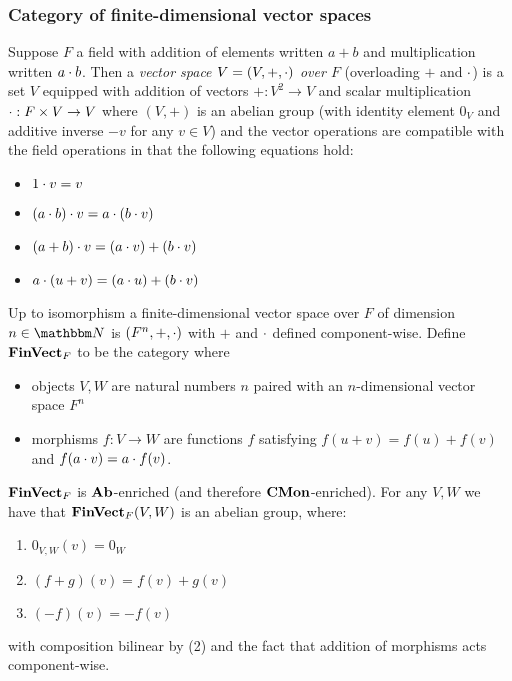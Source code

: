 \subsubsection{Category of finite-dimensional vector spaces}
\label{sec:categories-with-biproducts:fdvect}

\begin{definition}
Suppose $F$ a field with addition of elements written $a + b$ and multiplication written $a \cdot b$. Then a
\emph{vector space $V = (V, +, \cdot)$ over $F$} (overloading $+$ and $\cdot$) is a set $V$ equipped with
addition of vectors $+: V^2 \to V$ and scalar multiplication $\cdot: F \times V \to V$ where $(V,+)$ is an
abelian group (with identity element $0_V$ and additive inverse $-v$ for any $v \in V$) and the vector
operations are compatible with the field operations in that the following equations hold:
\begin{itemize}
\item $1 \cdot v = v$
\item $(a \cdot b) \cdot v = a \cdot (b \cdot v)$
\item $(a + b) \cdot v = (a \cdot v) + (b \cdot v)$
\item $a \cdot (u + v) = (a \cdot u) + (b \cdot v)$
\end{itemize}
\end{definition}

Up to isomorphism a finite-dimensional vector space over $F$ of dimension $n \in \Nat$ is $(F^n, +, \cdot)$
with $+$ and $\cdot$ defined component-wise. Define $\mathbf{FinVect}_F$ to be the category where
\begin{itemize}
\item objects $V, W$ are natural numbers $n$ paired with an $n$-dimensional vector space $F^n$
\item morphisms $f: V \to W$ are functions $f$ satisfying $f(u + v) = f(u) + f(v)$ and $f(a \cdot v) = a \cdot f(v)$.
\end{itemize}

$\mathbf{FinVect}_F$ is $\mathbf{Ab}$-enriched (and therefore $\mathbf{CMon}$-enriched). For any $V, W$ we have that $\mathbf{FinVect}_F(V,W)$
is an abelian group, where:
\begin{enumerate}
\item $0_{V,W}(v) = 0_W$
\item $(f + g)(v) = f(v) + g(v)$
\item $(-f)(v) = -f(v)$
\end{enumerate}
\noindent with composition bilinear by (2) and the fact that addition of morphisms acts component-wise.

%
